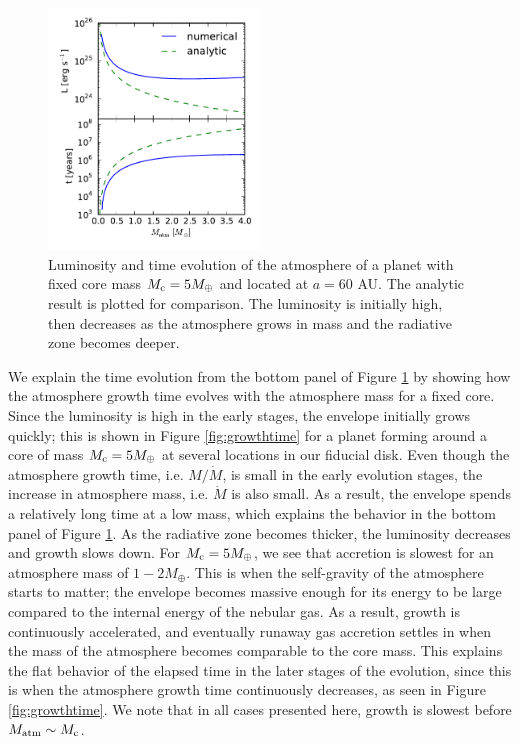 \documentclass[apj]{emulateapj}
\begin{document}
\begin{figure}[h]
\centering
\includegraphics[width=0.5\textwidth]{../../figs/ModelAtmospheres/RadSelfGravPoly/PaperFigs/Lt_profiles_v2.pdf}
\caption{Luminosity and time evolution of the atmosphere of a planet with fixed core mass $M_{\rm c}=5 M_{\oplus}$ and located at $a=60$ AU. The analytic result is plotted for comparison. The luminosity is initially high, then decreases as the atmosphere grows in mass and the radiative zone becomes deeper.}
\label{fig:Ltplot}
\end{figure}

 
We explain the time evolution from the bottom panel of Figure \ref{fig:Ltplot} by showing how the atmosphere growth time evolves with the atmosphere mass for a fixed core. Since the luminosity is high in the early stages, the envelope initially grows quickly; this is shown in Figure \ref{fig:growthtime} for a planet forming around a core of mass $M_{\rm c}=5 M_{\oplus}$ at several locations in our fiducial disk. Even though the atmosphere growth time, i.e. $M/\dot{M}$, is small in the early evolution stages, the increase in atmosphere mass, i.e. $\dot{M}$ is also small. As a result, the envelope spends a relatively long time at a low mass, which explains the behavior in the bottom panel of Figure \ref{fig:Ltplot}. As the radiative zone becomes thicker, the luminosity decreases and growth slows down. For $M_{\rm c}=5 M_{\oplus}$, we see that accretion is slowest for an atmosphere mass of $1-2 M_{\oplus}$. This is when the self-gravity of the atmosphere starts to matter; the envelope becomes massive enough for its energy to be large compared to the internal energy of the nebular gas. As a result, growth is continuously accelerated, and eventually runaway gas accretion settles in when the mass of the atmosphere becomes comparable to the core mass. This explains the flat behavior of the elapsed time in the later stages of the evolution, since this is when the atmosphere growth time continuously decreases, as seen in Figure \ref{fig:growthtime}. We note that in all cases presented here, growth is slowest before $M_{\rm{atm}} \sim M_{\rm c}$.  %
 
\end{document}
